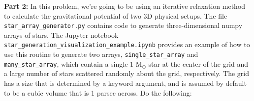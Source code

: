\documentclass[10pt]{article}
\begin{document}
\vspace{5mm}

\newpage
\newpage
\noindent 
{\large \textbf{Part 2:}} In this problem, we're going to be
using an iterative relaxation method to calculate the gravitational potential of
two 3D physical setups.  The file
\texttt{star\_array\_generator.py} contains code to generate
three-dimensional numpy arrays of stars.  The Jupyter notebook
\texttt{star\_generation\_visualization\_example.ipynb} provides an
example of how to use this routine to generate two arrays, \texttt{single\_star\_array}
and \texttt{many\_star\_array}, which contain a single 1
M$_\odot$ star at the center of the grid and a large number of stars
scattered randomly about the grid, respectively.  The grid has a size
that is determined by a keyword argument, and is assumed by default to be a
cubic volume that is 1 parsec across.  Do the following:
\end{document}
